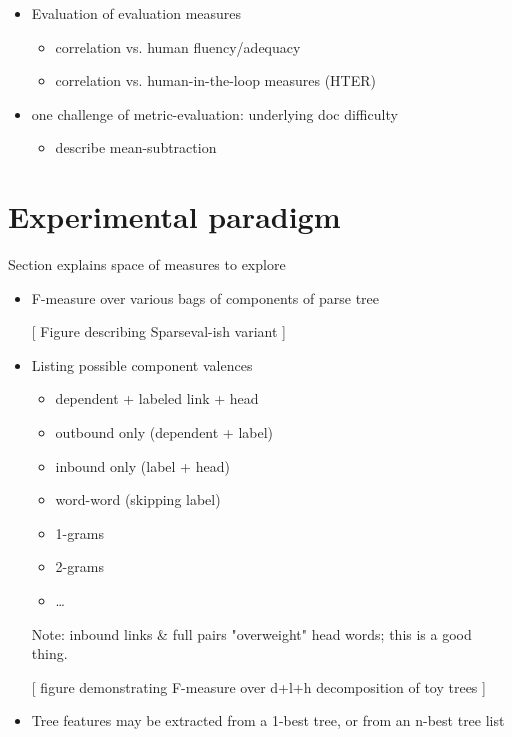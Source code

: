 \documentclass{kluwer}    %
\begin{document}
\begin{article}
\begin{itemize}
\item Evaluation of evaluation measures
  \begin{itemize}
  \item correlation vs. human fluency/adequacy 
  \item correlation vs. human-in-the-loop measures (HTER)
  \end{itemize}
\item one challenge of metric-evaluation: underlying doc difficulty 
  \begin{itemize}
  \item describe mean-subtraction
  \end{itemize}
\end{itemize}

\section{Experimental paradigm}

Section explains space of measures to explore

\begin{itemize}
\item F-measure over various bags of components of parse tree

  [ Figure describing Sparseval-ish variant ]

\item Listing possible component valences
  \begin{itemize}
  \item dependent + labeled link + head 
  \item outbound only (dependent +
    label)
  \item inbound only (label + head)
  \item word-word (skipping label)
  \end{itemize}
  \begin{itemize}
  \item 1-grams
  \item 2-grams
  \item \ldots{}
  \end{itemize}
  
  Note: inbound links \& full pairs "overweight" head words; this is
  a good thing.

  [ figure demonstrating F-measure over d+l+h decomposition of toy
  trees ]
    
\item Tree features may be extracted from a 1-best tree, or from an
  n-best tree list 


\end{itemize}
\end{article}
\end{document}
